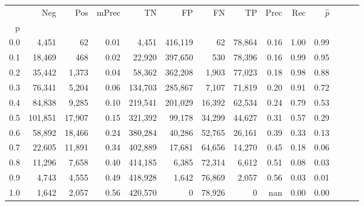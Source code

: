 \begin{tabular}{rrrrrrrrrrrrrr}
\toprule
{} &      Neg &     Pos & mPrec &       TN &       FP &      FN &      TP &  Prec &   Rec & $\hat{p}$ \\
p   &          &         &       &          &          &         &         &       &       &           \\
\midrule
0.0 &    4,451 &      62 &  0.01 &    4,451 &  416,119 &      62 &  78,864 &  0.16 &  1.00 &      0.99 \\
0.1 &   18,469 &     468 &  0.02 &   22,920 &  397,650 &     530 &  78,396 &  0.16 &  0.99 &      0.95 \\
0.2 &   35,442 &   1,373 &  0.04 &   58,362 &  362,208 &   1,903 &  77,023 &  0.18 &  0.98 &      0.88 \\
0.3 &   76,341 &   5,204 &  0.06 &  134,703 &  285,867 &   7,107 &  71,819 &  0.20 &  0.91 &      0.72 \\
0.4 &   84,838 &   9,285 &  0.10 &  219,541 &  201,029 &  16,392 &  62,534 &  0.24 &  0.79 &      0.53 \\
0.5 &  101,851 &  17,907 &  0.15 &  321,392 &   99,178 &  34,299 &  44,627 &  0.31 &  0.57 &      0.29 \\
0.6 &   58,892 &  18,466 &  0.24 &  380,284 &   40,286 &  52,765 &  26,161 &  0.39 &  0.33 &      0.13 \\
0.7 &   22,605 &  11,891 &  0.34 &  402,889 &   17,681 &  64,656 &  14,270 &  0.45 &  0.18 &      0.06 \\
0.8 &   11,296 &   7,658 &  0.40 &  414,185 &    6,385 &  72,314 &   6,612 &  0.51 &  0.08 &      0.03 \\
0.9 &    4,743 &   4,555 &  0.49 &  418,928 &    1,642 &  76,869 &   2,057 &  0.56 &  0.03 &      0.01 \\
1.0 &    1,642 &   2,057 &  0.56 &  420,570 &        0 &  78,926 &       0 &   nan &  0.00 &      0.00 \\
\bottomrule
\end{tabular}
